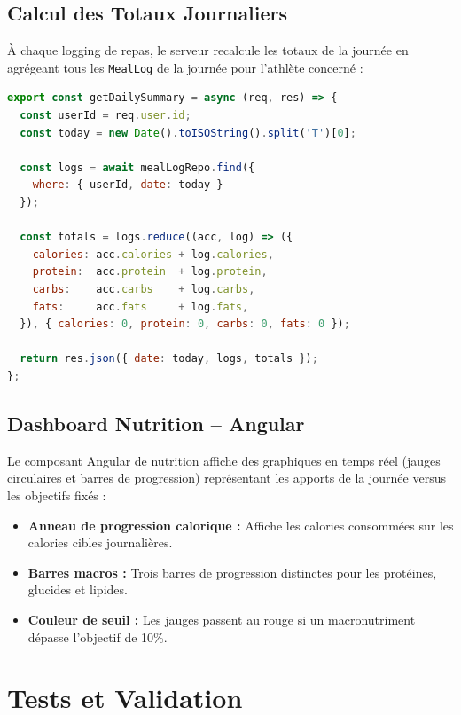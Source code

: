 \subsection{Calcul des Totaux Journaliers}
À chaque logging de repas, le serveur recalcule les totaux de la journée en agrégeant tous les \texttt{MealLog} de la journée pour l'athlète concerné :

\begin{lstlisting}[language=JavaScript,
    caption=Extrait NutritionController.ts -- Calcul du bilan journalier]
export const getDailySummary = async (req, res) => {
  const userId = req.user.id;
  const today = new Date().toISOString().split('T')[0];

  const logs = await mealLogRepo.find({
    where: { userId, date: today }
  });

  const totals = logs.reduce((acc, log) => ({
    calories: acc.calories + log.calories,
    protein:  acc.protein  + log.protein,
    carbs:    acc.carbs    + log.carbs,
    fats:     acc.fats     + log.fats,
  }), { calories: 0, protein: 0, carbs: 0, fats: 0 });

  return res.json({ date: today, logs, totals });
};
\end{lstlisting}

\subsection{Dashboard Nutrition -- Angular}
Le composant Angular de nutrition affiche des graphiques en temps réel (jauges circulaires et barres de progression) représentant les apports de la journée versus les objectifs fixés :
\begin{itemize}
    \item \textbf{Anneau de progression calorique :} Affiche les calories consommées sur les calories cibles journalières.
    \item \textbf{Barres macros :} Trois barres de progression distinctes pour les protéines, glucides et lipides.
    \item \textbf{Couleur de seuil :} Les jauges passent au rouge si un macronutriment dépasse l'objectif de 10\%.
\end{itemize}

\section{Tests et Validation}


